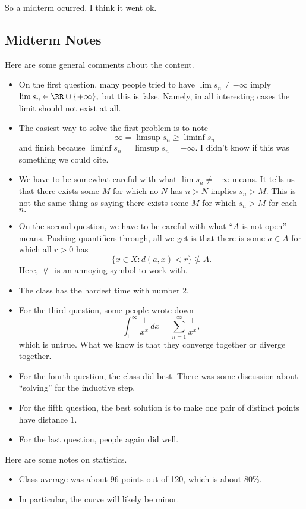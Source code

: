 \documentclass[../notes.tex]{subfiles}
\begin{document}















So a midterm ocurred. I think it went ok.

\subsection{Midterm Notes}
Here are some general comments about the content.
\begin{itemize}
	\item On the first question, many people tried to have $\lim s_n\ne-\infty$ imply $\lim s_n\in\RR\cup\{+\infty\},$ but this is false. Namely, in all interesting cases the limit should not exist at all.
	\item The easiest way to solve the first problem is to note
	\[-\infty=\limsup s_n\ge\liminf s_n\]
	and finish because $\liminf s_n=\limsup s_n=-\infty.$ I didn't know if this was something we could cite.
	\item We have to be somewhat careful with what $\lim s_n\ne-\infty$ means. It tells us that there exists some $M$ for which no $N$ has $n>N$ implies $s_n>M.$ This is not the same thing as saying there exists some $M$ for which $s_n>M$ for each $n.$
	\item On the second question, we have to be careful with what ``$A$ is not open'' means. Pushing quantifiers through, all we get is that there is some $a\in A$ for which all $r>0$ has
	\[\{x\in X:d(a,x)<r\}\not\subseteq A.\]
	Here, $\not\subseteq$ is an annoying symbol to work with.
	\item The class has the hardest time with number 2.
	\item For the third question, some people wrote down
	\[\int_1^\infty\frac1{x^x}\,dx=\sum_{n=1}^\infty\frac1{x^x},\]
	which is untrue. What we know is that they converge together or diverge together.
	\item For the fourth question, the class did best. There was some discussion about ``solving'' for the inductive step.
	\item For the fifth question, the best solution is to make one pair of distinct points have distance $1.$
	\item For the last question, people again did well.
\end{itemize}
Here are some notes on statistics.
\begin{itemize}
	\item Class average was about 96 points out of 120, which is about 80\%.
	\item In particular, the curve will likely be minor.
\end{itemize}
\end{document}
